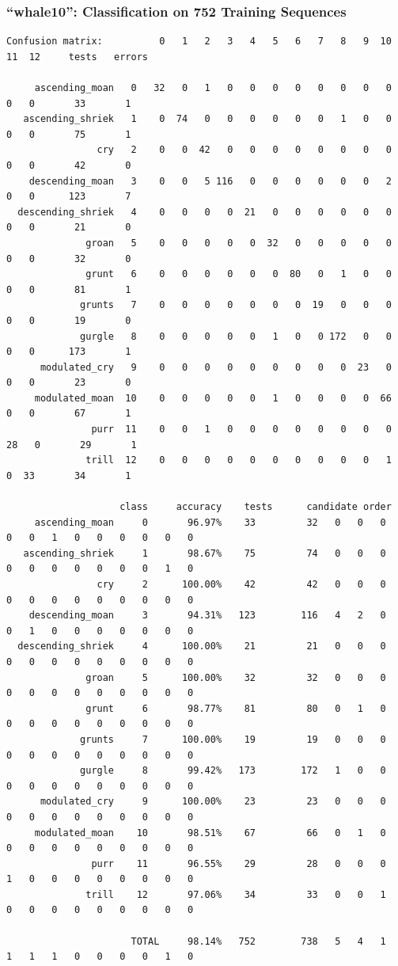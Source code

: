 \documentclass{beamer}
\begin{document}
\begin{frame}[fragile]
\frametitle{``whale10'': Classification on 752 Training Sequences}

\tiny{
\begin{verbatim}
Confusion matrix:          0   1   2   3   4   5   6   7   8   9  10  11  12     tests   errors

     ascending_moan   0   32   0   1   0   0   0   0   0   0   0   0   0   0       33       1
   ascending_shriek   1    0  74   0   0   0   0   0   0   1   0   0   0   0       75       1
                cry   2    0   0  42   0   0   0   0   0   0   0   0   0   0       42       0
    descending_moan   3    0   0   5 116   0   0   0   0   0   0   2   0   0      123       7
  descending_shriek   4    0   0   0   0  21   0   0   0   0   0   0   0   0       21       0
              groan   5    0   0   0   0   0  32   0   0   0   0   0   0   0       32       0
              grunt   6    0   0   0   0   0   0  80   0   1   0   0   0   0       81       1
             grunts   7    0   0   0   0   0   0   0  19   0   0   0   0   0       19       0
             gurgle   8    0   0   0   0   0   1   0   0 172   0   0   0   0      173       1
      modulated_cry   9    0   0   0   0   0   0   0   0   0  23   0   0   0       23       0
     modulated_moan  10    0   0   0   0   0   1   0   0   0   0  66   0   0       67       1
               purr  11    0   0   1   0   0   0   0   0   0   0   0  28   0       29       1
              trill  12    0   0   0   0   0   0   0   0   0   0   1   0  33       34       1

                    class     accuracy    tests      candidate order
     ascending_moan     0       96.97%    33         32   0   0   0   0   0   1   0   0   0   0   0   0
   ascending_shriek     1       98.67%    75         74   0   0   0   0   0   0   0   0   0   0   1   0
                cry     2      100.00%    42         42   0   0   0   0   0   0   0   0   0   0   0   0
    descending_moan     3       94.31%   123        116   4   2   0   0   1   0   0   0   0   0   0   0
  descending_shriek     4      100.00%    21         21   0   0   0   0   0   0   0   0   0   0   0   0
              groan     5      100.00%    32         32   0   0   0   0   0   0   0   0   0   0   0   0
              grunt     6       98.77%    81         80   0   1   0   0   0   0   0   0   0   0   0   0
             grunts     7      100.00%    19         19   0   0   0   0   0   0   0   0   0   0   0   0
             gurgle     8       99.42%   173        172   1   0   0   0   0   0   0   0   0   0   0   0
      modulated_cry     9      100.00%    23         23   0   0   0   0   0   0   0   0   0   0   0   0
     modulated_moan    10       98.51%    67         66   0   1   0   0   0   0   0   0   0   0   0   0
               purr    11       96.55%    29         28   0   0   0   1   0   0   0   0   0   0   0   0
              trill    12       97.06%    34         33   0   0   1   0   0   0   0   0   0   0   0   0

                      TOTAL     98.14%   752        738   5   4   1   1   1   1   0   0   0   0   1   0
\end{verbatim}
}

\end{frame}
\end{document}
